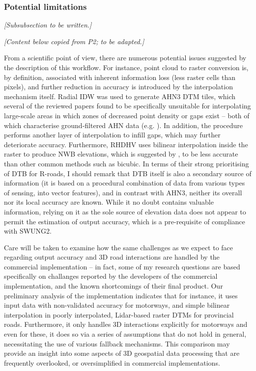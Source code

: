 \subsubsection{Potential limitations}

\textit{[Subsubsection to be written.]}

\textit{[Content below copied from P2; to be adapted.]}

From a scientific point of view, there are numerous potential issues suggested by the description of this workflow. For instance, point cloud to raster conversion is, by definition, associated with inherent information loss (less raster cells than pixels), and further reduction in accuracy is introduced by the interpolation mechanism itself. Radial IDW was used to generate AHN3 DTM tiles, which several of the reviewed papers found to be specifically unsuitable for interpolating large-scale areas in which zones of decreased point density or gaps exist – both of which characterise ground-filtered AHN data (e.g. \cite{guo_etal_2010}). In addition, the procedure performs another layer of interpolation to infill gaps, which may further deteriorate accuracy. Furthermore, RHDHV uses bilinear interpolation inside the raster to produce NWB elevations, which is suggested by \cite{shi_etal_2005}, to be less accurate than other common methods such as bicubic. In terms of their strong prioritising of DTB for R-roads, I should remark that DTB itself is also a secondary source of information (it is based on a procedural combination of data from various types of sensing, into vector features), and in contrast with AHN3, neither its overall nor its local accuracy are known. While it no doubt contains valuable information, relying on it as the sole source of elevation data does not appear to permit the estimation of output accuracy, which is a pre-requisite of compliance with SWUNG2.

Care will be taken to examine how the same challenges as we expect to face regarding output accuracy and 3D road interactions are handled by the commercial implementation – in fact, some of my research questions are based specifically on challanges reported by the developers of the commercial implementation, and the known shortcomings of their final product. Our preliminary analysis of the implementation indicates that for instance, it uses input data with non-validated accuracy for motorways, and simple bilinear interpolation in poorly interpolated, Lidar-based raster DTMs for provincial roads. Furthermore, it only handles 3D interactions explicitly for motorways and even for these, it does so via a series of assumptions that do not hold in general, necessitating the use of various fallback mechanisms. This comparison may provide an insight into some aspects of 3D geospatial data processing that are frequently overlooked, or oversimplified in commercial implementations.

